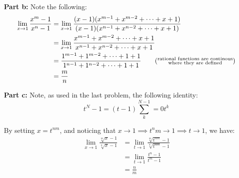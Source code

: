 \documentclass{article}
\begin{document}
\noindent\textbf{Part b:} Note the following:
\begin{align*}
  \lim_{x\to1}\frac{x^m-1}{x^n-1}&=\lim_{x\to1}\frac{(x-1)(x^{m-1}+x^{m-2}+\cdots+x+1)}{(x-1)(x^{n-1}+x^{n-2}+\cdots+x+1)}\\
  &=\lim_{x\to1}\frac{x^{m-1}+x^{m-2}+\cdots+x+1}{x^{n-1}+x^{n-2}+\cdots+x+1}\\
  &=\frac{1^{m-1}+1^{m-2}+\cdots+1+1}{1^{n-1}+1^{n-2}+\cdots+1+1}\tag{$\substack{\text{rational functions are continous}\\\text{where they are defined}}$}\\
  &=\frac{m}{n}
\end{align*}
\bigskip

\noindent\textbf{Part c:} Note, as used in the last problem, the following identity:
$$t^N-1=(t-1)\sum^{N-1}_k=0t^k$$

By setting $x=t^{nm}$, and noticing that $x\to1\implies t^nm\to1\implies t\to1$, we have:
\begin{align*}
  \lim_{x\to1}\frac{\sqrt[m]{x}-1}{\sqrt[n]{x}-1}&=\lim_{t\to1}\frac{\sqrt[m]{t^{nm}}-1}{\sqrt[n]{t^{nm}}-1}\tag{def. of $t^nm$}\\
  &=\lim_{t\to1}\frac{t^n-1}{t^m-1}\\
  &=\frac{n}{m}\tag{problem b}
\end{align*}
\bigskip
\end{document}
